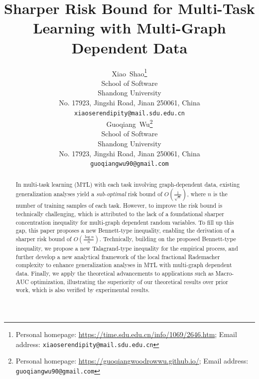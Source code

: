 \documentclass{article}
\title{Sharper Risk Bound for Multi-Task Learning with Multi-Graph Dependent Data}
\author{%
   Xiao~Shao\thanks{Personal homepage: \url{https://time.sdu.edu.cn/info/1069/2646.htm}; Email address: \texttt{xiaoserendipity@mail.sdu.edu.cn}} \\
  School of Software \\ 
  Shandong University \\
  No. 17923, Jingshi Road, Jinan 250061, China  \\
  \texttt{xiaoserendipity@mail.sdu.edu.cn}\\ 
  \And
  Guoqiang~Wu\thanks{Personal homepage: \url{https://guoqiangwoodrowwu.github.io/}; Email address: \texttt{guoqiangwu90@gmail.com}} \\
  School of Software \\
  Shandong University \\
  No. 17923, Jingshi Road, Jinan 250061, China  \\
  \texttt{guoqiangwu90@gmail.com}
}
\begin{document}
\maketitle


\begin{abstract}
  In multi-task learning (MTL) with each task involving graph-dependent data,
existing generalization analyses yield a \emph{sub-optimal} risk bound of $O(\frac{1}{\sqrt{n}})$, where $n$ is the number of training samples of each task. However, to improve the risk bound is technically challenging, which is attributed to the lack of a foundational sharper concentration inequality for multi-graph dependent random variables. 
To fill up this gap, this paper proposes a new Bennett-type inequality, enabling the derivation of a sharper risk bound of $O(\frac{\log n}{n})$. 
Technically, building on the proposed Bennett-type inequality, we propose a new Talagrand-type inequality for the empirical process, and further develop a new analytical framework of the local fractional Rademacher complexity to enhance generalization analyses in MTL with multi-graph dependent data. 
Finally, we apply the theoretical advancements to applications such as Macro-AUC optimization, illustrating the superiority of our theoretical results over prior work, which is also verified by experimental results.
\end{abstract}
\end{document}
